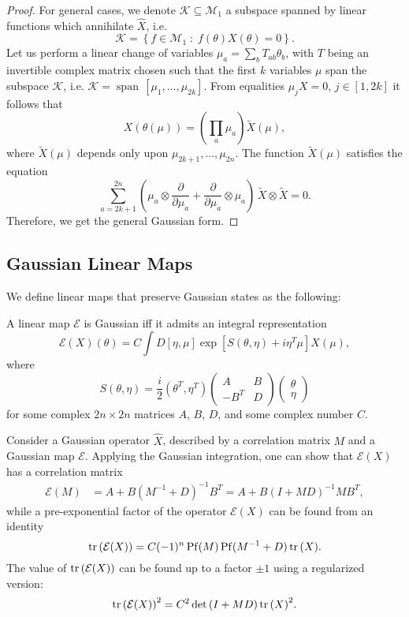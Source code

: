 \documentclass{SciPost}
\begin{document}
\begin{proof}
For general cases, we denote $\mathcal K \subseteq \mathcal M_1$ a subspace spanned by linear functions which annihilate $\hat X$, i.e.
$$
\mathcal K=\left\{ f \in \mathcal M_1 \; : \; f(\theta)X(\theta)=0\right\}.
$$
Let us perform a linear change of variables $\mu_a=\sum_b T_{ab} \theta_b$, with $T$ being an invertible complex matrix chosen such  that the first $k$ variables $\mu$ span the subspace $\mathcal K$, i.e. $\mathcal K=\operatorname{span}\, [ \mu_1,\ldots,\mu_{2k}]$. From equalities $\mu_j X=0$, $j\in [1,2k]$ it follows that 
$$
X(\theta(\mu))=\left(\prod_a \mu_a \right) \tilde{X}(\mu),
$$
where $\tilde{X}(\mu)$ depends only upon $\mu_{2k+1},\ldots,\mu_{2n}$. The function $\tilde{X}(\mu)$ satisfies the equation
$$
\sum_{a=2k+1}^{2n}\left(\mu_a\otimes \frac{\partial}{\partial\mu_a} + \frac{\partial}{\partial\mu_a}\otimes \mu_a\right)\, \tilde{X}\otimes \tilde{X}=0.
$$
Therefore, we get the general Gaussian form.
\end{proof}

\subsection{Gaussian Linear Maps}
We define linear maps that preserve Gaussian states as the following:
\begin{definition}
A linear map $\mathcal E$ is Gaussian iff it admits an integral  representation
\begin{equation}
	\mathcal E(X)(\theta) = C \int D[\eta,\mu] \exp{\left[ S(\theta,\eta) + i\eta^T \mu \right]} X(\mu),
\end{equation}
where
\begin{equation}
	S(\theta,\eta)= \frac{i}{2} (\theta^T,\eta^T)
	\begin{pmatrix}
		A & B \\ -B^T & D
	\end{pmatrix}
	\begin{pmatrix}
		\theta \\ \eta
	\end{pmatrix}
\end{equation}
for some complex  $2n\times 2n$ matrices $A$, $B$, $D$, and some complex number $C$.
\end{definition}
Consider a Gaussian operator $\hat X$, described by a correlation matrix $M$ and a Gaussian map $\mathcal E$. Applying the Gaussian integration, one can show that $\mathcal E(X)$ has a correlation matrix
\begin{equation*}
\begin{aligned}
	\mathcal E(M) &= A + B \left(M^{-1} + D \right)^{-1} B^T
	= A + B \left(I + MD \right)^{-1} M B^T,
\end{aligned}
\end{equation*}
while a pre-exponential factor of the operator $\mathcal E(X)$ can be found from an  identity
$$
\operatorname{tr}{ \left(\mathcal E(X)\right)} = C (-1)^n \operatorname{Pf}(M) \operatorname{Pf}(M^{-1}+D) \operatorname{tr}{(X)}.
$$
The value of $\operatorname{tr}{(\mathcal E(X))}$ can be found up to a factor $\pm 1$ using a regularized version:
$$
\operatorname{tr}{ \left( \mathcal E(X) \right) }^2 = C^2 \det{\left( I + M D \right) } \operatorname{tr}{(X)}^2.
$$


\end{document}
